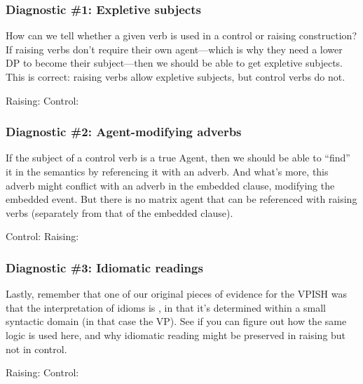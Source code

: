 \documentclass{article}
\begin{document}
    \subsubsection{Diagnostic \#1: Expletive subjects}
How can we tell whether a given verb is used in a control or raising construction? If raising verbs don't require their own agent---which is why they need a lower DP to become their subject---then we should be able to get expletive subjects. This is correct: raising verbs allow expletive subjects, but control verbs do not.

\ea Raising:
    \z
\ex Control:
    \z
\z

    \subsubsection{Diagnostic \#2: Agent-modifying adverbs}
If the subject of a control verb is a true Agent, then we should be able to ``find'' it in the semantics by referencing it with an adverb. And what's more, this adverb might conflict with an adverb in the embedded clause, modifying the embedded event. But there is no matrix agent that can be referenced with raising verbs (separately from that of the embedded clause).

\ea Control:
    \z
\ex Raising:
    \z
\z

    \subsubsection{Diagnostic \#3: Idiomatic readings}
Lastly, remember that one of our original pieces of evidence for the VPISH was that the interpretation of idioms is , in that it's determined within a small syntactic domain (in that case the VP). See if you can figure out how the same logic is used here, and why idiomatic reading might be preserved in raising but not in control.

\ea Raising:
    \z
\ex Control:
    \z
\z
\end{document}
